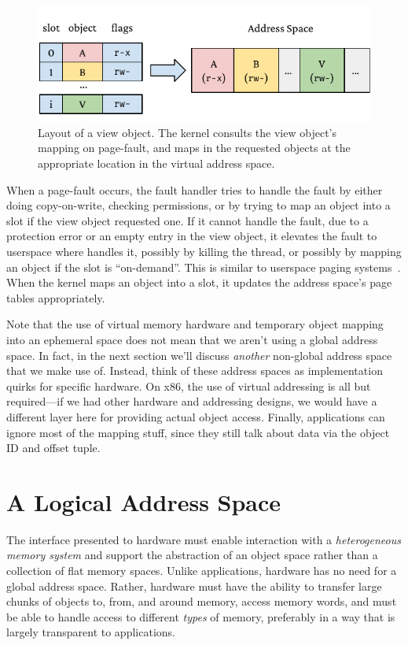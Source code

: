\begin{figure}
    \centering
    \includegraphics[width=\linewidth]{fig/view}
    \caption[Layout of a view object]{Layout of a view object. The kernel consults the view object's mapping on page-fault,
        and maps in the requested objects at the appropriate location in the virtual address space.}
    \label{fig:view}
\end{figure}

When a page-fault occurs, the fault handler tries to handle the fault by either doing copy-on-write,
checking permissions, or by trying to map an object into a slot if the view object requested one.
If it cannot handle the fault, \eg due to a protection error or an empty entry in the view
object, it elevates the fault to userspace where \libcore handles it, possibly by killing the
thread, or possibly by mapping an object if the slot is ``on-demand''. This is similar to userspace
paging systems~\cite{l4,accetta:usenix86s}. When the kernel
maps an object into a slot, it updates the address space's page tables appropriately.

Note that the use of virtual memory hardware and temporary object mapping into an ephemeral space does not mean that we
aren't using a global address space. In fact, in the next section we'll discuss \emph{another} non-global address space
that we make use of. Instead, think of these address spaces as implementation quirks for specific hardware. On x86, the
use of virtual addressing is all but required---if we had other hardware and addressing designs, we would have a
different layer here for providing actual object access. Finally, applications can ignore most of the \libcore mapping
stuff, since they still talk about data via the object ID and offset tuple.

\section{A Logical Address Space}

The interface presented to hardware must enable interaction with a
\textit{heterogeneous memory system} and support the abstraction of an object space rather than a
collection of flat memory spaces. Unlike applications, hardware has no need for
a global address space. Rather, hardware must
have the ability to transfer large chunks of objects to, from, and around memory, access memory words, and must be able to
handle access to different \emph{types} of memory, preferably in a way that is largely transparent to
applications.

